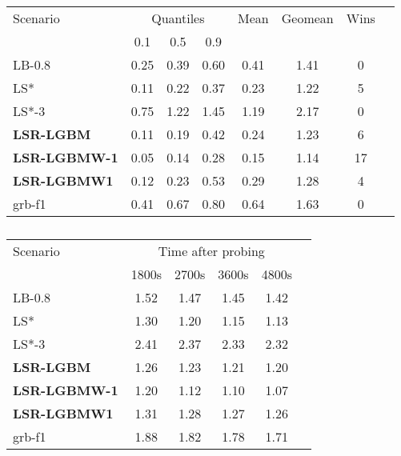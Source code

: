 \documentclass[3p, authoryear, times, doubleblind]{elsarticle}
\begin{document}
{\begin{table}[h]
\centering
\caption{}
\label{tab:primal_integral_ml_B_2-hour}
\begin{tabular}{lccccccc}
\toprule
{Scenario} & \multicolumn{3}{c}{Quantiles} & {Mean} & {Geomean} & {Wins} \\
{} & {0.1} & {0.5} & {0.9} & {} & {} & {} \\
\midrule
LB-0.8 & 0.25 & 0.39 & 0.60 & 0.41 & 1.41 & 0 \\
LS* & 0.11 & 0.22 & 0.37 & 0.23 & 1.22 & 5 \\
LS*-3 & 0.75 & 1.22 & 1.45 & 1.19 & 2.17 & 0 \\
\textbf{LSR-LGBM} & 0.11 & 0.19 & 0.42 & 0.24 & 1.23 & 6 \\
\textbf{LSR-LGBMW-1} & 0.05 & 0.14 & 0.28 & 0.15 & 1.14 & 17 \\
\textbf{LSR-LGBMW1} & 0.12 & 0.23 & 0.53 & 0.29 & 1.28 & 4 \\
grb-f1 & 0.41 & 0.67 & 0.80 & 0.64 & 1.63 & 0 \\
\bottomrule
\end{tabular}
\end{table}


\begin{table}[h]
\centering
\caption{}
\label{tab:fcn:gap_over_time_B}
\begin{tabular}{lccccc}
\toprule
{Scenario} & \multicolumn{4}{c}{Time after probing} \\
{} & {1800s} & {2700s} & {3600s} & {4800s} \\
\midrule
LB-0.8 & 1.52 & 1.47 & 1.45 & 1.42 \\
LS* & 1.30 & 1.20 & 1.15 & 1.13 \\
LS*-3 & 2.41 & 2.37 & 2.33 & 2.32 \\
\textbf{LSR-LGBM} & 1.26 & 1.23 & 1.21 & 1.20 \\
\textbf{LSR-LGBMW-1} & 1.20 & 1.12 & 1.10 & 1.07 \\
\textbf{LSR-LGBMW1} & 1.31 & 1.28 & 1.27 & 1.26 \\
grb-f1 & 1.88 & 1.82 & 1.78 & 1.71 \\
\bottomrule
\end{tabular}
\end{table}


}
\end{document}
